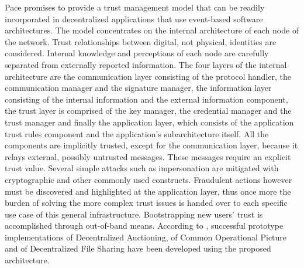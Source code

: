   Pace \cite{pace} promises to provide a trust management model that can be readily incorporated in decentralized
  applications that use event-based software architectures. The model concentrates on the internal architecture of each node
  of the network. Trust relationships between digital, not physical, identities are considered. Internal knowledge and
  perceptions of each node are carefully separated from externally reported information. The four layers of the internal
  architecture are the communication layer consisting of the protocol handler, the communication manager and the signature
  manager, the information layer consisting of the internal information and the external information component, the trust
  layer is comprised of the key manager, the credential manager and the trust manager and finally the application layer,
  which consists of the application trust rules component and the application's subarchitecture itself. All the components
  are implicitly trusted, except for the communication layer, because it relays external, possibly untrusted messages. These
  messages require an explicit trust value. Several simple attacks such as impersonation are mitigated with cryptographic and
  other commonly used constructs. Fraudulent actions however must be discovered and highlighted at the application layer,
  thus once more the burden of solving the more complex trust issues is handed over to each specific use case of this general
  infrastructure. Bootstrapping new users' trust is accomplished through out-of-band means. According to \cite{pace},
  successful prototype implementations of Decentralized Auctioning, of Common Operational Picture and of Decentralized File
  Sharing have been developed using the proposed architecture.

